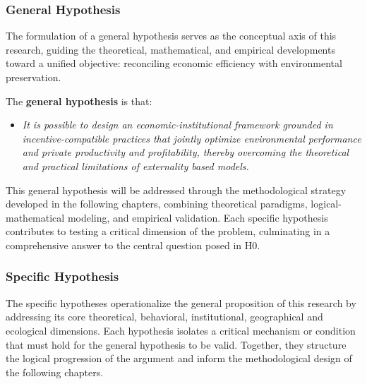 \subsubsection{General Hypothesis}

The formulation of a general hypothesis serves as the conceptual axis of this research, guiding the theoretical, mathematical, and empirical developments toward a unified objective: reconciling economic efficiency with environmental preservation.

\vspace{1em}

The \textbf{general hypothesis} is that: 

\begin{itemize} 

    \item[\textbf{H0.}] 
    
    \textit{It is possible to design an economic-institutional framework grounded in incentive-compatible practices that jointly optimize environmental performance and private productivity and profitability, thereby overcoming the theoretical and practical limitations of externality based models.}
    
\end{itemize}

This general hypothesis will be addressed through the methodological strategy developed in the following chapters, combining theoretical paradigms, logical-mathematical modeling, and empirical validation. Each specific hypothesis contributes to testing a critical dimension of the problem, culminating in a comprehensive answer to the central question posed in H0.

\subsubsection{Specific Hypothesis}

The specific hypotheses operationalize the general proposition of this research by addressing its core theoretical, behavioral, institutional, geographical and ecological dimensions. Each hypothesis isolates a critical mechanism or condition that must hold for the general hypothesis to be valid. Together, they structure the logical progression of the argument and inform the methodological design of the following chapters.

\vspace{1em}

